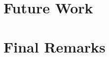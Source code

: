 \documentclass[11pt]{report}
\begin{document}
\begin{doublespace}
\indent


\section{Future Work}

\indent


\section{Final Remarks}

\indent



\end{doublespace}

\begin{singlespace}
	
	\nocite{*}
\end{singlespace}


\end{document}
